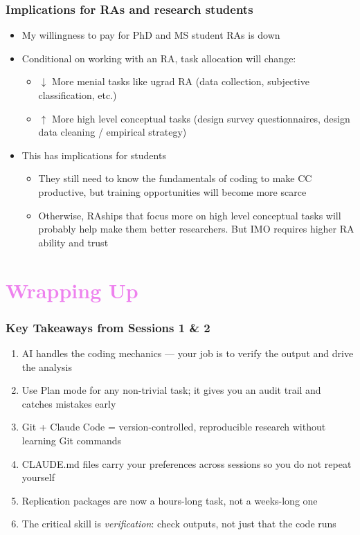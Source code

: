 \documentclass[aspectratio=169, 12pt]{beamer}
\begin{document}
\begin{frame}
\frametitle{Implications for RAs and research students}

\begin{itemize}
    \item My willingness to pay for PhD and MS student RAs is down
    \item Conditional on working with an RA, task allocation will change:
    \begin{itemize}
        \item $\downarrow$ More menial tasks like ugrad RA {\color{gray}(data collection, subjective classification, etc.)}
        \item $\uparrow$  More high level conceptual tasks {\color{gray}(design survey questionnaires, design data cleaning / empirical strategy)}
    \end{itemize} 
    \item This has implications for students 
    \begin{itemize}
        \item They still need to know the fundamentals of coding to make CC productive, but training opportunities will become more scarce
        \item Otherwise, RAships that focus more on high level conceptual tasks will probably help make them better researchers. But IMO requires higher RA ability and trust
    \end{itemize}
\end{itemize}

\end{frame}



\section{\textcolor{violet}{Wrapping Up \vspace{0.3in}}}


\begin{frame}
\frametitle{Key Takeaways from Sessions 1 \& 2}

\begin{enumerate}
    \item AI handles the coding mechanics --- your job is to verify the output and drive the analysis
    \smallskip
    \item Use Plan mode for any non-trivial task; it gives you an audit trail and catches mistakes early
    \smallskip
    \item Git + Claude Code = version-controlled, reproducible research without learning Git commands
    \smallskip
    \item CLAUDE.md files carry your preferences across sessions so you do not repeat yourself
    \smallskip
    \item Replication packages are now a hours-long task, not a weeks-long one
    \smallskip
    \item The critical skill is \textit{verification}: check outputs, not just that the code runs
\end{enumerate}

\end{frame}
\end{document}
